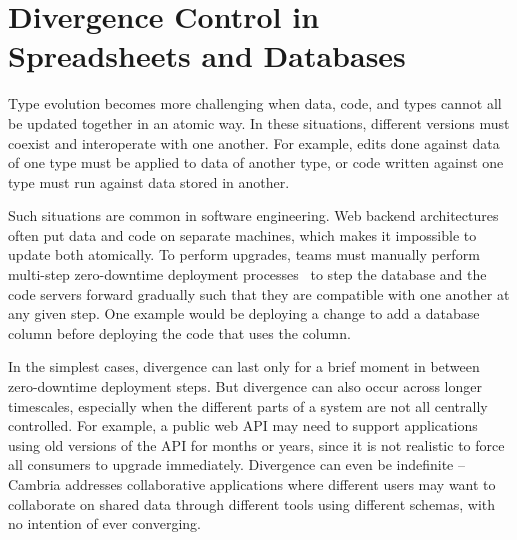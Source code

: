 \documentclass[english,submission]{programming}
\begin{document}
\section{Divergence Control in Spreadsheets and Databases}
Type evolution becomes more challenging when data, code, and types cannot all be updated
together in an atomic way. In these situations, different versions must coexist and interoperate
with one another. For example, edits done against data of one type must be applied to
data of another type, or code written against one type must run against data stored in another.

Such situations are common in software engineering. Web backend architectures often put data and
code on separate machines, which makes it impossible to update both atomically. To perform
upgrades, teams must manually perform multi-step zero-downtime deployment processes~\cite{planetscalerails}
to step the database and the code servers forward gradually such that they are compatible with one
another at any given step. One example would be deploying a change to add a database column
before deploying the code that uses the column.

In the simplest cases, divergence can last only for a brief moment in between zero-downtime
deployment steps. But divergence can also occur across longer timescales, especially when
the different parts of a system are not all centrally controlled. For example,
a public web API may need to support applications using old versions of the API for months or
years, since it is not realistic to force all consumers to upgrade immediately. Divergence can
even be indefinite -- Cambria \cite{Cambria} addresses collaborative applications where different
users may want to collaborate on shared data through different tools using different schemas,
with no intention of ever converging.
\end{document}
